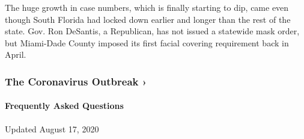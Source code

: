 The huge growth in case numbers, which is finally starting to dip, came
even though South Florida had locked down earlier and longer than the
rest of the state. Gov. Ron DeSantis, a Republican, has not issued a
statewide mask order, but Miami-Dade County imposed its first facial
covering requirement back in April.

\href{https://www.nytimes3xbfgragh.onion/news-event/coronavirus?action=click\&pgtype=Article\&state=default\&region=MAIN_CONTENT_3\&context=storylines_faq}{}

\hypertarget{the-coronavirus-outbreak-}{%
\subsubsection{The Coronavirus Outbreak
›}\label{the-coronavirus-outbreak-}}

\hypertarget{frequently-asked-questions}{%
\paragraph{Frequently Asked
Questions}\label{frequently-asked-questions}}

Updated August 17, 2020

